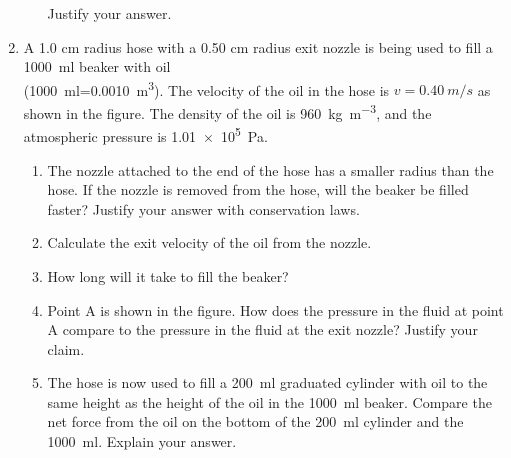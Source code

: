 \documentclass{../../../oss-apphys}
\begin{document}
\begin{enumerate}[leftmargin=15pt]
\begin{enumerate}[leftmargin=18pt]
    \vspace{.1in}Justify your answer.
  \end{enumerate}
  \newpage

  \begin{center}
  \end{center}  
\item A 1.0 cm radius hose with a 0.50 cm radius exit nozzle is being used to
  fill a \SI{1000}{ml} beaker with oil\\
  (\SI{1000}{ml}=\SI{0.0010}{m^3}). The velocity of the oil in the hose is
  $v=\SI{0.40}{m/s}$ as shown in the figure. The density of the oil is
  \SI{960}{\kilo\gram\per\metre^3}, and the atmospheric pressure is
  \SI{1.01e5}{\pascal}.
  
  \begin{enumerate}[leftmargin=18pt]
  \item The nozzle attached to the end of the hose has a smaller radius than
    the hose. If the nozzle is removed from the hose, will the beaker be filled
    faster? Justify your answer with conservation laws.
    \vspace{.75in}
    
  \item Calculate the exit velocity of the oil from the nozzle.
    \vspace{.75in}
    
  \item How long will it take to fill the beaker?
    \vspace{.75in}
    
  \item Point A is shown in the figure. How does the pressure in the fluid at
    point A compare to the pressure in the fluid at the exit nozzle? Justify
    your claim.
    \vspace{.75in}
    
  \item The hose is now used to fill a \SI{200}{\milli\litre} graduated
    cylinder with oil to the same height as the height of the oil in the
    \SI{1000}{\milli\litre} beaker. Compare the net force from the oil on the
    bottom of the \SI{200}{\milli\litre} cylinder and the
    \SI{1000}{\milli\litre}. Explain your answer.
    \vspace{1in}
    

\end{enumerate}
\end{enumerate}
\end{document}
